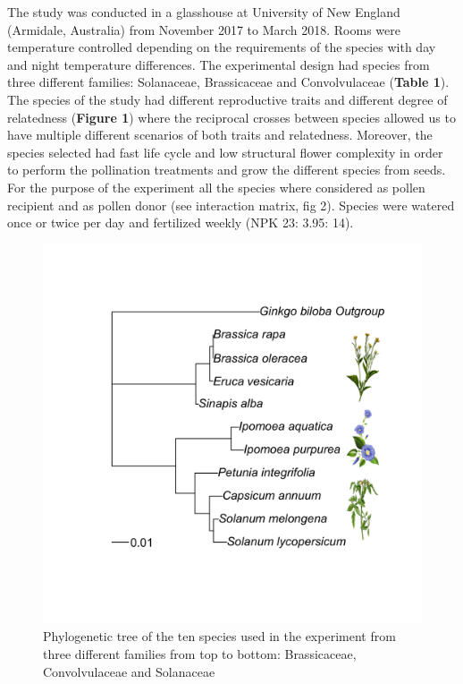 \documentclass[11pt,a4paper]{article}
\begin{document}
The study was conducted in a glasshouse at University of New England
(Armidale, Australia) from November 2017 to March 2018. Rooms were
temperature controlled depending on the requirements of the species with
day and night temperature differences. The experimental design had
species from three different families: Solanaceae, Brassicaceae and
Convolvulaceae (\textbf{Table 1}). The species of the study had
different reproductive traits and different degree of relatedness
(\textbf{Figure 1}) where the reciprocal crosses between species allowed
us to have multiple different scenarios of both traits and relatedness.
Moreover, the species selected had fast life cycle and low structural
flower complexity in order to perform the pollination treatments and
grow the different species from seeds. For the purpose of the experiment
all the species where considered as pollen recipient and as pollen donor
(see interaction matrix, fig 2). Species were watered once or twice per
day and fertilized weekly (NPK 23: 3.95: 14).

\newpage

\begin{figure}
\includegraphics[width=1\linewidth]{images/phylo_image} \caption{Phylogenetic tree of the ten species used in the experiment from three different families from top to bottom: Brassicaceae, Convolvulaceae and Solanaceae}\label{fig:unnamed-chunk-1}
\end{figure}
\end{document}
